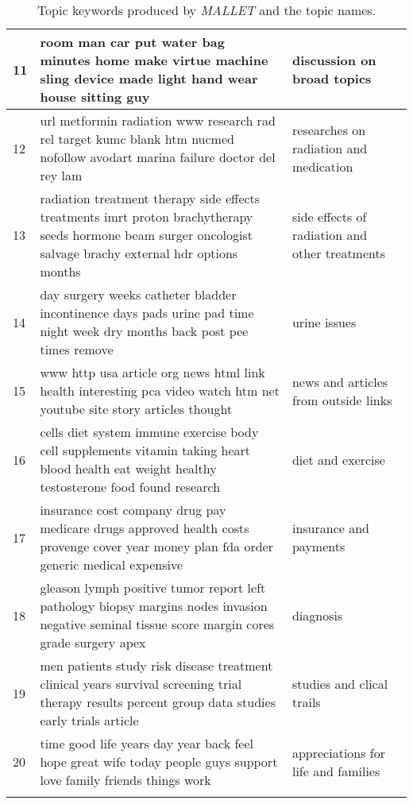 \begin{longtable}[c]{| p{.10\linewidth} | p{.60\linewidth} | p{.30\linewidth} |}
    \hline
    11 &  room man car put water bag minutes home make virtue machine sling device made light hand wear house sitting guy & discussion on broad topics \\
    \hline
    12 &  url metformin radiation www research rad rel target kumc blank htm nucmed nofollow avodart marina failure doctor del rey lam & researches on radiation and medication \\
    \hline
    13 &  radiation treatment therapy side effects treatments imrt proton brachytherapy seeds hormone beam surger oncologist salvage brachy external hdr options months & side effects of radiation and other treatments \\
    \hline
    14 &  day surgery weeks catheter bladder incontinence days pads urine pad time night week dry months back post pee times remove & urine issues \\
    \hline
    15 &  www http usa article org news html link health interesting pca video watch htm net youtube site story articles thought  & news and articles from outside links \\
    \hline
    16 &  cells diet system immune exercise body cell supplements vitamin taking heart blood health eat weight healthy testosterone food found research & diet and exercise \\
    \hline
    17 &  insurance cost company drug pay medicare drugs approved health costs provenge cover year money plan fda order generic medical expensive  & insurance and payments \\
    \hline
    18 &  gleason lymph positive tumor report left pathology biopsy margins nodes invasion negative seminal tissue score margin cores grade surgery apex  & diagnosis \\
    \hline
    19 &  men patients study risk disease treatment clinical years survival screening trial therapy results percent group data studies early trials article & studies and clical trails \\
    \hline
    20 &  time good life years day year back feel hope great wife today people guys support love family friends things work & appreciations for life and families \\
    \hline
\caption{Topic keywords produced by \textit{MALLET} and the topic names.}
\end{longtable}